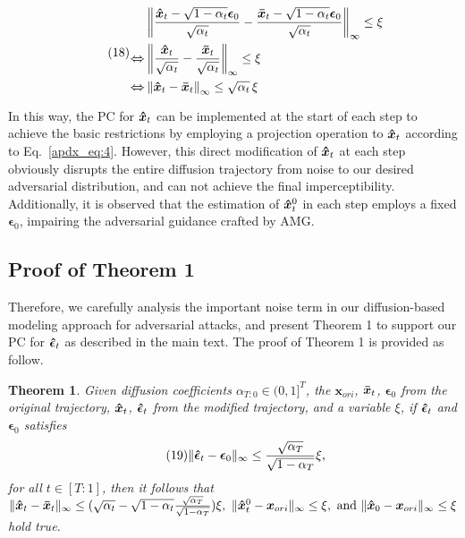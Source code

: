\documentclass{article}
\newtheorem{theorem}{Theorem}
\begin{document}
\begin{equation}\tag{18}
\begin{split}
& \left\|\frac{\boldsymbol{\Hat{x}}_t - \sqrt{1-\alpha_t}\boldsymbol{\epsilon}_0}{\sqrt{\alpha_t}} - \frac{\boldsymbol{\Bar{x}}_t - \sqrt{1-\alpha_t}\boldsymbol{\epsilon}_0}{\sqrt{\alpha_t}}\right\|_\infty \leq \xi \\
\xLeftrightarrow{} &  \left\|\frac{\boldsymbol{\Hat{x}}_t}{\sqrt{\alpha_t}} - \frac{\boldsymbol{\Bar{x}}_t}{\sqrt{\alpha_t}}\right\|_\infty \leq \xi \\
\xLeftrightarrow{} & \left\|{\boldsymbol{\Hat{x}}_t} - {\boldsymbol{\Bar{x}}_t}\right\|_\infty \leq \sqrt{\alpha_t}\,\xi
\end{split}
\label{apdx_eq:4}
\end{equation}
In this way, the PC for $\boldsymbol{\Hat{x}}_t$ can be implemented  at the start of each step to achieve the basic restrictions by employing a projection operation to $\boldsymbol{\Hat{x}}_t$ according to Eq.~\eqref{apdx_eq:4}. However, this direct modification of $\boldsymbol{\Hat{x}}_t$ at each step obviously disrupts the entire diffusion trajectory from noise to our desired adversarial distribution, and can not achieve the final imperceptibility. Additionally, it is observed that the estimation of $\boldsymbol{\Hat{x}}_t^0$ in each step employs a fixed $\boldsymbol{\epsilon}_0$, impairing the adversarial guidance crafted by AMG.
\subsection{Proof of Theorem 1}  \label{app:B2}
Therefore, we carefully analysis the important noise term in our diffusion-based modeling approach for adversarial attacks, and present Theorem 1 to support our PC for $\boldsymbol{\Hat{\epsilon}}_t$ as described in the main text. The proof of Theorem 1 is provided as follow.

\begin{theorem}
\label{thm1}
    Given diffusion coefficients $\alpha_{T:0}\in(0,1]^T$, the $\boldsymbol{x}_{ori}$, $\boldsymbol{\Bar{x}}_{t}$, $\boldsymbol{\epsilon}_0$ from the original trajectory, $\boldsymbol{\Hat{x}}_{t}$, $\boldsymbol{\Hat{\epsilon}}_{t}$ from the modified trajectory, and a variable $\xi$, if $\boldsymbol{\Hat{\epsilon}}_{t}$ and $\boldsymbol{{\epsilon}}_{0}$ satisfies 
    \begin{equation}\tag{19}
        \|\boldsymbol{\Hat{\epsilon}}_{t} - \boldsymbol{\epsilon}_{0}\|_{\infty} \leq \frac{\sqrt{\alpha_T}}{\sqrt{1-\alpha_T}}\xi,
    \label{apdx_eq:5}
    \end{equation}
    for all $t\in[T:1]$, then it follows that 
        $\|\boldsymbol{\Hat{x}}_{t} - \boldsymbol{\Bar{x}}_{t}\|_{\infty} \leq (\sqrt{\alpha_{t}} - \sqrt{1 - \alpha_{t}} \frac{\sqrt{\alpha_T}}{\sqrt{1-\alpha_T}})\xi, \ \|\boldsymbol{\Hat{x}}_{t}^{0} - \boldsymbol{x}_{ori}\|_{\infty}\leq\xi, \ \text{and}\ \|\boldsymbol{\Hat{x}}_{0} - \boldsymbol{x}_{ori}\|_{\infty}\leq\xi$
    hold true.
\end{theorem}
\end{document}

